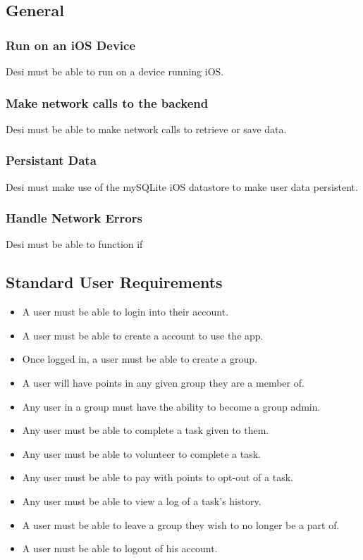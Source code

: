 \documentclass[11pt, a4paper]{report}
\begin{document}
\subsection{General}
\subsubsection{Run on an iOS Device}
Desi must be able to run on a device running iOS.
\subsubsection{Make network calls to the backend}
Desi must be able to make network calls to retrieve or save data.
\subsubsection{Persistant Data}
Desi must make use of the mySQLite iOS datastore to make user data persistent.
\subsubsection{Handle Network Errors}
Desi must be able to function if 

\subsection{Standard User Requirements}
\begin{itemize} 
\item A user must be able to login into their account.
\item A user must be able to create a account to use the app.
\item Once logged in, a user must be able to create a group.
\item A user will have points in any given group they are a member of.
\item Any user in a group must have the ability to become a group admin.
\item Any user must be able to complete a task given to them.
\item Any user must be able to volunteer to complete a task.
\item Any user must be able to pay with points to opt-out of a task.
\item Any user must be able to view a log of a task's history.
\item A user must be able to leave a group they wish to no longer be a part of.
\item A user must be able to logout of his account.
 \end{itemize}
\end{document}
